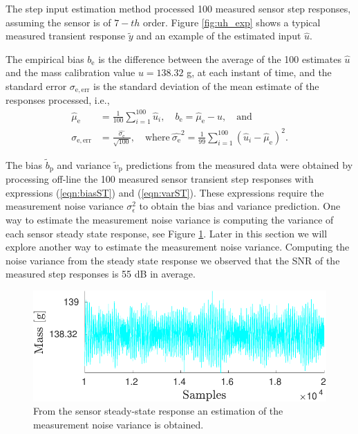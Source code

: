 The step input estimation method processed 100 measured sensor step responses, assuming the sensor is of $\mathrm{7-}th$ order.
Figure \ref{fig:uh_exp} shows a typical measured transient response $\widetilde{y}$ and an example of the estimated input $\widehat{u}$.

The empirical bias $b_{\mathrm{e}}$ is the difference between the average of the 100 estimates $\widehat{u}$ and the mass calibration value $u = 138.32$ g, at each instant of time, and the standard error $\sigma_\mathrm{e,err}$ is the standard deviation of the mean estimate of the responses processed, i.e.,
\begin{equation} \begin{aligned} \widehat{\mu}_{\mathrm{e}} &= \frac{1}{100} \sum_{i=1}^{100}{ \widehat{u}_{i} }, \quad {b}_{\mathrm{e}} = \widehat{\mu}_{\mathrm{e}} - u, \quad \mathrm{and} \\  \sigma_{\mathrm{e,err}} &= \frac{\widehat{\sigma_\mathrm{e}}}{\sqrt{100}}, \quad \mathrm{where} \ \widehat{\sigma_\mathrm{e}}^2 = \frac{1}{99} \sum_{i=1}^{100}{ \left( \widehat{u}_i - \widehat{\mu}_{\mathrm{e}} \right)^2 } . \end{aligned} \end{equation}


The bias $\widetilde{b}_{\mathrm{p}}$ and variance $\widetilde{v}_{\mathrm{p}}$ predictions from the measured data were obtained by processing off-line the 100 measured sensor transient step responses with expressions (\ref{eqn:biasST}) and (\ref{eqn:varST}).
These expressions require the measurement noise variance $\sigma_\epsilon^2$ to obtain the bias and variance prediction.
One way to estimate the measurement noise variance is computing the variance of each sensor steady state response, see Figure \ref{fig:y_ss}.
Later in this section we will explore another way to estimate the measurement noise variance.
Computing the noise variance from the steady state response we observed that the SNR of the measured step responses is 55 dB in average.

\begin{figure}[!htb]
\centering
\includegraphics[width=0.69\columnwidth]{./ChapterExperimentalValidation/fig/Fig_7.pdf}
\caption{ \label{fig:y_ss} 
From the sensor steady-state response an estimation of the measurement noise variance is obtained.}
\end{figure}

